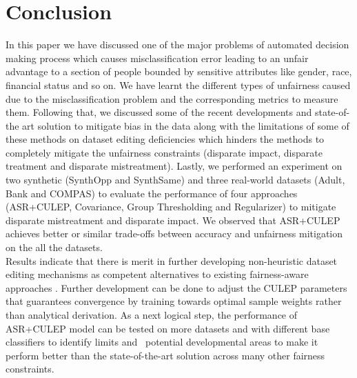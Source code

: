 \documentclass[runningheads]{llncs}
\begin{document}
\section{Conclusion}
In this paper we have discussed one of the major problems of automated decision making process which causes misclassification error leading to an unfair advantage to a section of people bounded by sensitive attributes like gender, race, financial status and so on. We have learnt the different types of unfairness caused due to the misclassification problem and the corresponding metrics to measure them. Following that, we discussed some of the recent developments and state-of-the art solution to mitigate bias in the data along with the limitations of some of these methods on dataset editing deficiencies which hinders the methods to completely mitigate the unfairness constraints (disparate impact, disparate treatment and disparate mistreatment). Lastly, we performed an experiment on two synthetic (SynthOpp and SynthSame) and three real-world datasets (Adult, Bank and COMPAS) to evaluate the performance of four approaches (ASR+CULEP, Covariance, Group Thresholding and Regularizer) to mitigate disparate mistreatment and disparate impact. We observed that ASR+CULEP achieves better or similar trade-offs between accuracy and unfairness mitigation on the all the datasets.\\
Results indicate that there is merit in further developing non-heuristic dataset editing mechanisms as competent alternatives to existing fairness-aware approaches \cite{krasanakis2018adaptive}. Further development can be done to adjust the CULEP parameters that guarantees convergence by training towards optimal sample weights rather than analytical derivation. As a next logical step, the performance of ASR+CULEP model can be tested on more datasets and with different base classifiers to identify limits and \ potential developmental areas to make it perform better than the state-of-the-art solution across many other fairness constraints.
\end{document}
